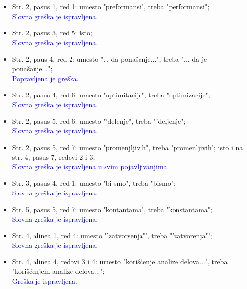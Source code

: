 \documentclass[a4paper]{report}
\newcommand{\odgovor}[1]{\textcolor{blue}{#1}}
\begin{document}
\begin{itemize}
  \item Str. 2, pasus 1, red 1: umesto "preformansi", treba "performansi";  \\
  \odgovor{Slovna greška je ispravljena.}  
  
  \item Str. 2, pasus 3, red 5: isto; \\
  \odgovor{Slovna greška je ispravljena.}
  
  \item Str. 2, paus 4, red 2: umesto "... da ponašanje...", treba "... da je ponašanje..."; \\
  \odgovor{Popravljena je greška.}
  
  \item Str. 2, pasus 4, red 6: umesto "optimitacije", treba "optimizacije"; \\
  \odgovor{Slovna greška je ispravljena.}
  
  \item Str. 2, pasus 5, red 6: umesto "'delenje", treba "'deljenje"; \\
  \odgovor{Slovna greška je ispravljena.}
  
  
  \item Str. 2, pasus 5, red 7: umesto "promenjljivih", treba "promenljivih"; isto i na str. 4, pasus 7, redovi 2 i 3; \\
  \odgovor{Slovna greška je ispravljena u svim pojavljivanjima.}
  
  \item Str. 3, pasus 4, red 1: umesto "bi smo", treba "bismo";\\
  \odgovor{Slovna greška je ispravljena.}
  
  \item Str. 5, pasus 5, red 7: umesto "kontantama", treba "konstantama";\\
  \odgovor{Slovna greška je ispravljena.}
  
  \item Str. 4, alinea 1, red 4: umesto "'zatvorsenja"', treba "'zatvorenja"';\\
  \odgovor{Slovna greška je ispravljena.}
  
  \item Str. 4, alinea 4, redovi 3 i 4: umesto "korišćenje analize delova...", treba "korišćenjem analize delova...";\\
  \odgovor{Greška je ispravljena.}
  

\end{itemize}
\end{document}
